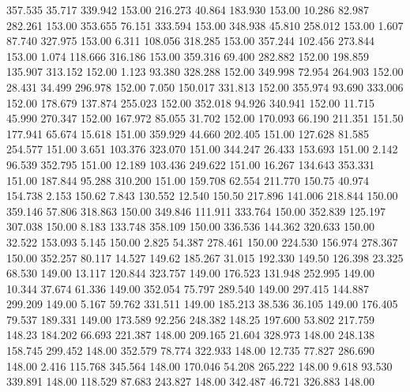  357.535   35.717  339.942       153.00
 216.273   40.864  183.930       153.00
  10.286   82.987  282.261       153.00
 353.655   76.151  333.594       153.00
 348.938   45.810  258.012       153.00
   1.607   87.740  327.975       153.00
   6.311  108.056  318.285       153.00
 357.244  102.456  273.844       153.00
   1.074  118.666  316.186       153.00
 359.316   69.400  282.882       152.00
 198.859  135.907  313.152       152.00
   1.123   93.380  328.288       152.00
 349.998   72.954  264.903       152.00
  28.431   34.499  296.978       152.00
   7.050  150.017  331.813       152.00
 355.974   93.690  333.006       152.00
 178.679  137.874  255.023       152.00
 352.018   94.926  340.941       152.00
  11.715   45.990  270.347       152.00
 167.972   85.055   31.702       152.00
 170.093   66.190  211.351       151.50
 177.941   65.674   15.618       151.00
 359.929   44.660  202.405       151.00
 127.628   81.585  254.577       151.00
   3.651  103.376  323.070       151.00
 344.247   26.433  153.693       151.00
   2.142   96.539  352.795       151.00
  12.189  103.436  249.622       151.00
  16.267  134.643  353.331       151.00
 187.844   95.288  310.200       151.00
 159.708   62.554  211.770       150.75
  40.974  154.738    2.153       150.62
   7.843  130.552   12.540       150.50
 217.896  141.006  218.844       150.00
 359.146   57.806  318.863       150.00
 349.846  111.911  333.764       150.00
 352.839  125.197  307.038       150.00
   8.183  133.748  358.109       150.00
 336.536  144.362  320.633       150.00
  32.522  153.093    5.145       150.00
   2.825   54.387  278.461       150.00
 224.530  156.974  278.367       150.00
 352.257   80.117   14.527       149.62
 185.267   31.015  192.330       149.50
 126.398   23.325   68.530       149.00
  13.117  120.844  323.757       149.00
 176.523  131.948  252.995       149.00
  10.344   37.674   61.336       149.00
 352.054   75.797  289.540       149.00
 297.415  144.887  299.209       149.00
   5.167   59.762  331.511       149.00
 185.213   38.536   36.105       149.00
 176.405   79.537  189.331       149.00
 173.589   92.256  248.382       148.25
 197.600   53.802  217.759       148.23
 184.202   66.693  221.387       148.00
 209.165   21.604  328.973       148.00
 248.138  158.745  299.452       148.00
 352.579   78.774  322.933       148.00
  12.735   77.827  286.690       148.00
   2.416  115.768  345.564       148.00
 170.046   54.208  265.222       148.00
   9.618   93.530  339.891       148.00
 118.529   87.683  243.827       148.00
 342.487   46.721  326.883       148.00
